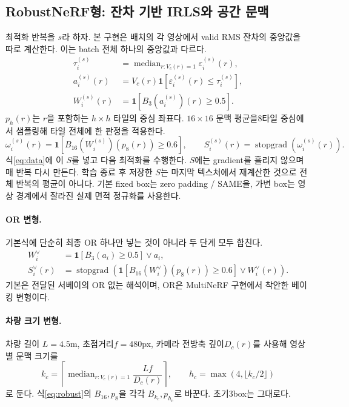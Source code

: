\documentclass[11pt,a4paper]{article}
\newcommand{\ind}{\mathbf{1}}
\newcommand{\sg}{\operatorname{stopgrad}}
\newcommand{\med}{\operatorname{median}}
\begin{document}
\subsection{RobustNeRF형: 잔차 기반 IRLS와 공간 문맥}
최적화 반복을 $s$라 하자. 본 구현은 배치의 각 영상에서 valid RMS 잔차의 중앙값을 따로 계산한다. 이는 batch 전체 하나의 중앙값과 다르다.
\begin{align}
 \tau_i^{(s)}&=\med_{r:V_c(r)=1}\varepsilon_i^{(s)}(r),\\
 a_i^{(s)}(r)&=V_c(r)\ind[\varepsilon_i^{(s)}(r)\le\tau_i^{(s)}],\\
 W_i^{(s)}(r)&=\ind[B_3(a_i^{(s)})(r)\ge0.5].
\end{align}
$p_h(r)$는 $r$을 포함하는 $h\times h$ 타일의 중심 좌표다. $16\times16$ 문맥 평균을8타일 중심에서 샘플링해 타일 전체에 한 판정을 적용한다.
\begin{equation}
 \omega_i^{(s)}(r)=\ind[B_{16}(W_i^{(s)})(p_8(r))\ge0.6],\qquad
 S_i^{(s)}(r)=\sg(\omega_i^{(s)}(r)).\label{eq:robust}
\end{equation}
식\eqref{eq:data}에 이 $S$를 넣고 다음 최적화를 수행한다. $S$에는 gradient를 흘리지 않으며 매 반복 다시 만든다. 학습 종료 후 저장한 $S$는 마지막 텍스처에서 재계산한 것으로 전체 반복의 평균이 아니다. 기본 fixed box는 zero padding / SAME을, 가변 box는 영상 경계에서 잘라진 실제 면적 정규화를 사용한다.

\paragraph{OR 변형.}
기본식에 단순히 최종 OR 하나만 넣는 것이 아니라 두 단계 모두 합친다.
\begin{align}
 W_i^{\lor}&=\ind[B_3(a_i)\ge0.5]\lor a_i,\\
 S_i^{\lor}(r)&=\sg\left(\ind[B_{16}(W_i^{\lor})(p_8(r))\ge0.6]\lor W_i^{\lor}(r)\right).
\end{align}
기본은 전달된 서베이의 OR 없는 해석이며, OR은 MultiNeRF 구현에서 착안한 베이킹 변형이다.

\paragraph{차량 크기 변형.}
차량 길이 $L=4.5$m, 초점거리$f=480$px, 카메라 전방축 깊이$D_c(r)$를 사용해 영상별 문맥 크기를
\begin{equation}
 k_c=\left\lceil\med_{r:V_c(r)=1}\frac{Lf}{D_c(r)}\right\rceil,
 \qquad h_c=\max(4,\lfloor k_c/2\rfloor)
\end{equation}
로 둔다. 식\eqref{eq:robust}의 $B_{16},p_8$을 각각 $B_{k_c},p_{h_c}$로 바꾼다. 초기3box는 그대로다.
\end{document}
